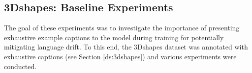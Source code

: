 
\subsection{3Dshapes: Baseline Experiments}
\label{expt:3dshapes_baseline}

The goal of these experiments was to investigate the importance of presenting exhaustive example captions to the model during training for potentially mitigating language drift. To this end, the 3Dshapes dataset was annotated with exhaustive captions (see Section \ref{ds:3dshapes}) and various experiments were conducted. %

